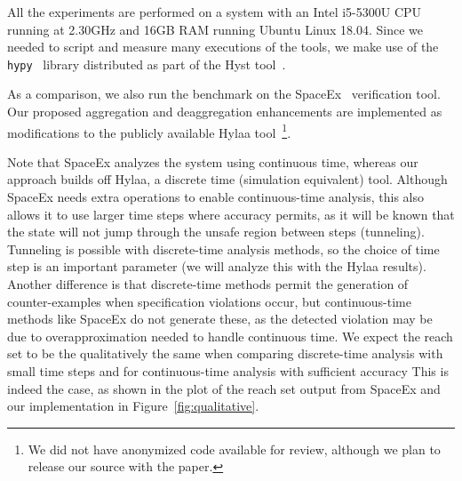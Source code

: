 All the experiments are performed on a system with an Intel i5-5300U CPU running at 2.30GHz and 16GB RAM running Ubuntu Linux 18.04.
%
Since we needed to script and measure many executions of the tools, we make use of the \texttt{hypy}~\cite{hypy} library distributed as part of the
Hyst tool~\cite{bak2015hscc}.

As a comparison, we also run the benchmark on the SpaceEx~\cite{spaceex} verification tool.
%
Our proposed aggregation and deaggregation enhancements are implemented as modifications to the publicly available
Hylaa tool~\cite{bak2017hscc}\footnote{We did not have anonymized code available for review, although we plan to release our source with the paper.}.

Note that SpaceEx analyzes the system using continuous time, whereas our approach builds off Hylaa, a discrete time (simulation equivalent) tool.
%
Although SpaceEx needs extra operations to enable continuous-time analysis, this also allows it to use larger time steps where accuracy permits, as
it will be known that the state will not jump through the unsafe region between steps (tunneling).
%
Tunneling is possible with discrete-time analysis methods, so the choice of time step is an important parameter (we will analyze this with the Hylaa results).
%
Another difference is that discrete-time methods permit the generation of counter-examples when specification violations occur, but continuous-time methods
like SpaceEx do not generate these, as the detected violation may be due to overapproximation needed to handle continuous time.
%
We expect the reach set to be the qualitatively the same when comparing discrete-time analysis with small time steps and for continuous-time analysis
with sufficient accuracy
%
This is indeed the case, as shown in the plot of the reach set output from SpaceEx and our implementation in Figure~\ref{fig:qualitative}.

